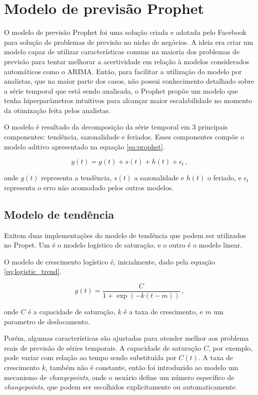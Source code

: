 \section{Modelo de previsão Prophet}
O modelo de previsão Prophet \cite{fbprophet} foi uma solução criada e adotada pelo Facebook para solução de problemas de previsão no nicho de negócios. A ideia era criar um modelo capaz de utilizar características comuns na maioria dos problemas de previsão para tentar melhorar a acertividade em relação à modelos considerados automáticos como o ARIMA. Então, para facilitar a utilização do modelo por analistas, que na maior parte dos casos, não possui conhecimento detalhado sobre a série temporal que está sendo analisada, o Prophet propõe um modelo que tenha hiperparâmetros intuitivos para alcançar maior escalabilidade no momento da otimização feita pelos analistas.

O modelo é resultado da decomposição da série temporal em 3 principais componentes: tendência, sazonalidade e feriados. Esses componentes compõe o modelo aditivo apresentado na equação \eqref{eq:prophet}.

\begin{equation}\label{eq:prophet}
    y(t) = g(t) + s(t) + h(t) + \epsilon_{t}\, ,
\end{equation}

onde $g(t)$ representa a tendência, $s(t)$ a sazonalidade e $h(t)$ o feriado, e $\epsilon_{t}$ representa o erro não acomodado pelos outros modelos.

\subsection{Modelo de tendência}
Exitem duas implementações do modelo de tendência que podem ser utilizados no Propet. Um é o modelo logístico de saturação, e o outro é o modelo linear.

O modelo de crescimento logístico é, inicialmente, dado pela equação \eqref{eq:logistic_trend}.

\begin{equation}\label{eq:logistic_trend}
    g(t)=\frac{C}{1+\exp (-k(t-m))}\, ,
\end{equation}

onde $C$ é a capacidade de saturação, $k$ é a taxa de crescimento, e $m$ um parametro de deslocamento.

Porém, algumas características são ajustadas para atender melhor aos problema reais de previsão de séries temporais. A capacidade de saturação $C$, por exemplo, pode variar com relação ao tempo sendo substituída por $C(t)$. A taxa de crescimento $k$, também não é constante, então foi introduzido ao modelo um mecanismo de \textit{changepoints}, onde o usuário define um número específico de \textit{changepoints}, que podem ser escolhidos explicitamente ou automaticamente.

